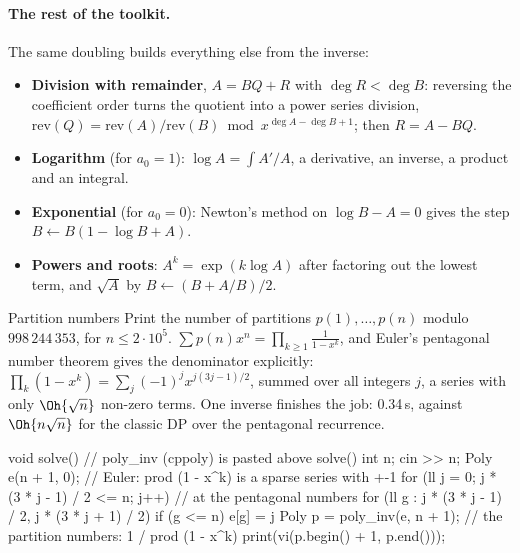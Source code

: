 \paragraph{The rest of the toolkit.} The same doubling builds everything else from the inverse:
\begin{itemize}
  \item \textbf{Division with remainder}, $A = BQ + R$ with $\deg R < \deg B$: reversing the coefficient order turns the quotient into a
        power series division, $\mathrm{rev}(Q) = \mathrm{rev}(A) / \mathrm{rev}(B) \bmod x^{\deg A - \deg B + 1}$; then $R = A - BQ$.
  \item \textbf{Logarithm} (for $a_0 = 1$): $\log A = \int A' / A$, a derivative, an inverse, a product and an integral.
  \item \textbf{Exponential} (for $a_0 = 0$): Newton's method on $\log B - A = 0$ gives the step $B \gets B (1 - \log B + A)$.
  \item \textbf{Powers and roots}: $A^k = \exp(k \log A)$ after factoring out the lowest term, and $\sqrt A$ by $B \gets (B + A/B) / 2$.
\end{itemize}


\begin{problem}{Partition numbers}
Print the number of partitions $p(1), \dots, p(n)$ modulo $998\,244\,353$, for $n \le 2 \cdot 10^5$.
\solution $\sum p(n) x^n = \prod_{k \ge 1} \frac{1}{1 - x^k}$, and Euler's pentagonal number theorem gives the denominator explicitly:
$\prod_k (1 - x^k) = \sum_j (-1)^j x^{j(3j-1)/2}$, summed over all integers $j$, a series with only $\Oh{\sqrt n}$ non-zero terms. One
inverse finishes the job: 0.34\,s, against $\Oh{n \sqrt n}$ for the classic DP over the pentagonal recurrence.
\end{problem}

\begin{code}
void solve() {  // poly_inv (cppoly) is pasted above solve()
    int n;
    cin >> n;
    Poly e(n + 1, 0);  // Euler: prod (1 - x^k) is a sparse series with +-1
    for (ll j = 0; j * (3 * j - 1) / 2 <= n; j++)  // at the pentagonal numbers
        for (ll g : {j * (3 * j - 1) / 2, j * (3 * j + 1) / 2})
            if (g <= n) e[g] = j %
    Poly p = poly_inv(e, n + 1);  // the partition numbers: 1 / prod (1 - x^k)
    print(vi(p.begin() + 1, p.end()));
}
\end{code}

